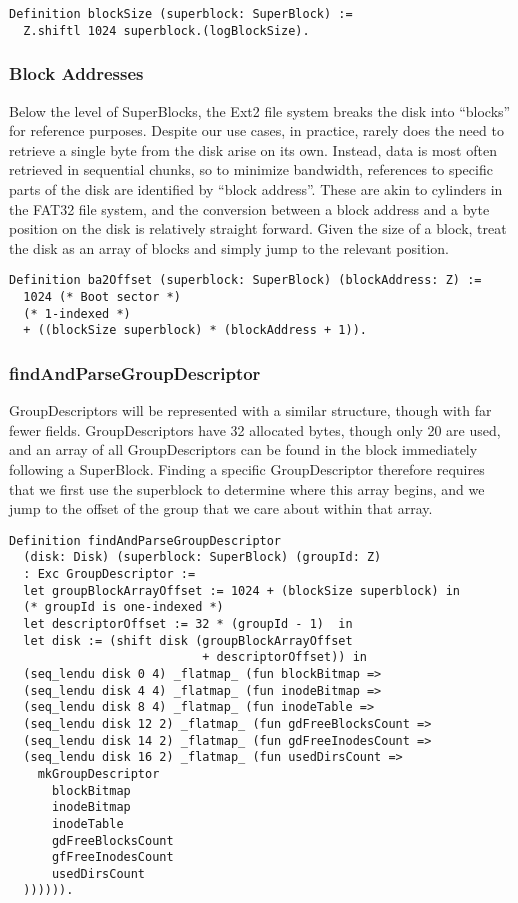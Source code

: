 \documentclass[nocopyrightspace]{sigplanconf}
\begin{document}
\begin{lstlisting}
Definition blockSize (superblock: SuperBlock) := 
  Z.shiftl 1024 superblock.(logBlockSize).
\end{lstlisting}

\subsubsection{Block Addresses}

Below the level of SuperBlocks, the Ext2 file system breaks the disk into
``blocks'' for reference purposes. Despite our use cases, in practice, rarely
does the need to retrieve a single byte from the disk arise on its own.
Instead, data is most often retrieved in sequential chunks, so to minimize
bandwidth, references to specific parts of the disk are identified by ``block
address''. These are akin to cylinders in the FAT32 file system, and the
conversion between a block address and a byte position on the disk is
relatively straight forward. Given the size of a block, treat the disk as an
array of blocks and simply jump to the relevant position.

\begin{lstlisting}
Definition ba2Offset (superblock: SuperBlock) (blockAddress: Z) :=
  1024 (* Boot sector *)
  (* 1-indexed *)
  + ((blockSize superblock) * (blockAddress + 1)).
\end{lstlisting}

\subsubsection{findAndParseGroupDescriptor}

GroupDescriptors will be represented with a similar structure, though with far
fewer fields. GroupDescriptors have 32 allocated bytes, though only 20 are
used, and an array of all GroupDescriptors can be found in the block
immediately following a SuperBlock. Finding a specific GroupDescriptor
therefore requires that we first use the superblock to determine where this
array begins, and we jump to the offset of the group that we care about within
that array.

\begin{lstlisting}
Definition findAndParseGroupDescriptor 
  (disk: Disk) (superblock: SuperBlock) (groupId: Z)
  : Exc GroupDescriptor :=
  let groupBlockArrayOffset := 1024 + (blockSize superblock) in
  (* groupId is one-indexed *)
  let descriptorOffset := 32 * (groupId - 1)  in
  let disk := (shift disk (groupBlockArrayOffset 
                           + descriptorOffset)) in
  (seq_lendu disk 0 4) _flatmap_ (fun blockBitmap =>
  (seq_lendu disk 4 4) _flatmap_ (fun inodeBitmap =>
  (seq_lendu disk 8 4) _flatmap_ (fun inodeTable =>
  (seq_lendu disk 12 2) _flatmap_ (fun gdFreeBlocksCount =>
  (seq_lendu disk 14 2) _flatmap_ (fun gdFreeInodesCount =>
  (seq_lendu disk 16 2) _flatmap_ (fun usedDirsCount =>
    mkGroupDescriptor
      blockBitmap
      inodeBitmap
      inodeTable
      gdFreeBlocksCount
      gfFreeInodesCount
      usedDirsCount
  )))))).
\end{lstlisting}
\end{document}
